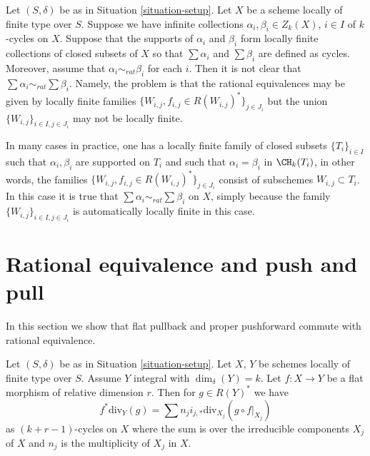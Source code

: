 \begin{remark}
\label{remark-infinite-sums-rational-equivalences}
Let $(S, \delta)$ be as in Situation \ref{situation-setup}.
Let $X$ be a scheme locally of finite type over $S$.
Suppose we have infinite collections $\alpha_i, \beta_i \in Z_k(X)$,
$i \in I$ of $k$-cycles on $X$. Suppose that the supports
of $\alpha_i$ and $\beta_i$ form locally finite collections
of closed subsets of $X$ so that $\sum \alpha_i$
and $\sum \beta_i$ are defined as cycles. Moreover, assume that
$\alpha_i \sim_{rat} \beta_i$ for each $i$. Then it is not
clear that $\sum \alpha_i \sim_{rat} \sum \beta_i$. Namely,
the problem is that the rational equivalences may be
given by locally finite
families $\{W_{i, j}, f_{i, j} \in R(W_{i, j})^*\}_{j \in J_i}$
but the union $\{W_{i, j}\}_{i \in I, j\in J_i}$ may not
be locally finite.

\medskip\noindent
In many cases in practice, one has a locally finite family of closed
subsets $\{T_i\}_{i \in I}$ such that $\alpha_i, \beta_i$
are supported on $T_i$ and such that $\alpha_i = \beta_i$
in $\CH_k(T_i)$, in other words, the families
$\{W_{i, j}, f_{i, j} \in R(W_{i, j})^*\}_{j \in J_i}$
consist of subschemes $W_{i, j} \subset T_i$. In this case it is true that
$\sum \alpha_i \sim_{rat} \sum \beta_i$ on $X$, simply because
the family $\{W_{i, j}\}_{i \in I, j\in J_i}$ is automatically
locally finite in this case.
\end{remark}






\section{Rational equivalence and push and pull}
\label{section-properties-rational-equivalence}

\noindent
In this section we show that flat pullback and proper pushforward
commute with rational equivalence.

\begin{lemma}
\label{lemma-prepare-flat-pullback-rational-equivalence}
Let $(S, \delta)$ be as in Situation \ref{situation-setup}.
Let $X$, $Y$ be schemes locally of finite type over $S$.
Assume $Y$ integral with $\dim_\delta(Y) = k$.
Let $f : X \to Y$ be a flat morphism of
relative dimension $r$. Then for $g \in R(Y)^*$ we have
$$
f^*\text{div}_Y(g) =
\sum n_j i_{j, *}\text{div}_{X_j}(g \circ f|_{X_j})
$$
as $(k + r - 1)$-cycles on $X$ where the sum is over the irreducible
components $X_j$ of $X$ and $n_j$ is the multiplicity of $X_j$ in $X$.
\end{lemma}


